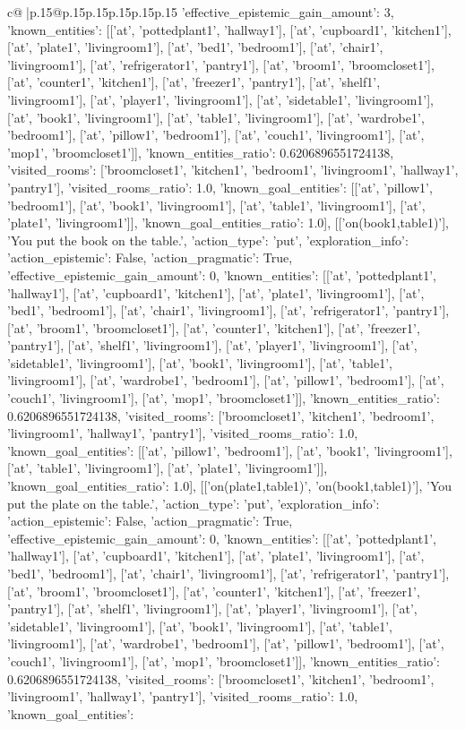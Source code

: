 \documentclass{article}
\begin{document}
{\begin{supertabular}{c@{$\;$}|p{.15\linewidth}@{}p{.15\linewidth}p{.15\linewidth}p{.15\linewidth}p{.15\linewidth}p{.15\linewidth}}
{{{'effective_epistemic_gain_amount': 3, 'known_entities': [['at', 'pottedplant1', 'hallway1'], ['at', 'cupboard1', 'kitchen1'], ['at', 'plate1', 'livingroom1'], ['at', 'bed1', 'bedroom1'], ['at', 'chair1', 'livingroom1'], ['at', 'refrigerator1', 'pantry1'], ['at', 'broom1', 'broomcloset1'], ['at', 'counter1', 'kitchen1'], ['at', 'freezer1', 'pantry1'], ['at', 'shelf1', 'livingroom1'], ['at', 'player1', 'livingroom1'], ['at', 'sidetable1', 'livingroom1'], ['at', 'book1', 'livingroom1'], ['at', 'table1', 'livingroom1'], ['at', 'wardrobe1', 'bedroom1'], ['at', 'pillow1', 'bedroom1'], ['at', 'couch1', 'livingroom1'], ['at', 'mop1', 'broomcloset1']], 'known_entities_ratio': 0.6206896551724138, 'visited_rooms': ['broomcloset1', 'kitchen1', 'bedroom1', 'livingroom1', 'hallway1', 'pantry1'], 'visited_rooms_ratio': 1.0, 'known_goal_entities': [['at', 'pillow1', 'bedroom1'], ['at', 'book1', 'livingroom1'], ['at', 'table1', 'livingroom1'], ['at', 'plate1', 'livingroom1']], 'known_goal_entities_ratio': 1.0}}], [['on(book1,table1)'], 'You put the book on the table.', {'action_type': 'put', 'exploration_info': {'action_epistemic': False, 'action_pragmatic': True, 'effective_epistemic_gain_amount': 0, 'known_entities': [['at', 'pottedplant1', 'hallway1'], ['at', 'cupboard1', 'kitchen1'], ['at', 'plate1', 'livingroom1'], ['at', 'bed1', 'bedroom1'], ['at', 'chair1', 'livingroom1'], ['at', 'refrigerator1', 'pantry1'], ['at', 'broom1', 'broomcloset1'], ['at', 'counter1', 'kitchen1'], ['at', 'freezer1', 'pantry1'], ['at', 'shelf1', 'livingroom1'], ['at', 'player1', 'livingroom1'], ['at', 'sidetable1', 'livingroom1'], ['at', 'book1', 'livingroom1'], ['at', 'table1', 'livingroom1'], ['at', 'wardrobe1', 'bedroom1'], ['at', 'pillow1', 'bedroom1'], ['at', 'couch1', 'livingroom1'], ['at', 'mop1', 'broomcloset1']], 'known_entities_ratio': 0.6206896551724138, 'visited_rooms': ['broomcloset1', 'kitchen1', 'bedroom1', 'livingroom1', 'hallway1', 'pantry1'], 'visited_rooms_ratio': 1.0, 'known_goal_entities': [['at', 'pillow1', 'bedroom1'], ['at', 'book1', 'livingroom1'], ['at', 'table1', 'livingroom1'], ['at', 'plate1', 'livingroom1']], 'known_goal_entities_ratio': 1.0}}], [['on(plate1,table1)', 'on(book1,table1)'], 'You put the plate on the table.', {'action_type': 'put', 'exploration_info': {'action_epistemic': False, 'action_pragmatic': True, 'effective_epistemic_gain_amount': 0, 'known_entities': [['at', 'pottedplant1', 'hallway1'], ['at', 'cupboard1', 'kitchen1'], ['at', 'plate1', 'livingroom1'], ['at', 'bed1', 'bedroom1'], ['at', 'chair1', 'livingroom1'], ['at', 'refrigerator1', 'pantry1'], ['at', 'broom1', 'broomcloset1'], ['at', 'counter1', 'kitchen1'], ['at', 'freezer1', 'pantry1'], ['at', 'shelf1', 'livingroom1'], ['at', 'player1', 'livingroom1'], ['at', 'sidetable1', 'livingroom1'], ['at', 'book1', 'livingroom1'], ['at', 'table1', 'livingroom1'], ['at', 'wardrobe1', 'bedroom1'], ['at', 'pillow1', 'bedroom1'], ['at', 'couch1', 'livingroom1'], ['at', 'mop1', 'broomcloset1']], 'known_entities_ratio': 0.6206896551724138, 'visited_rooms': ['broomcloset1', 'kitchen1', 'bedroom1', 'livingroom1', 'hallway1', 'pantry1'], 'visited_rooms_ratio': 1.0, 'known_goal_entities': }}}
\end{supertabular}}
\end{document}
